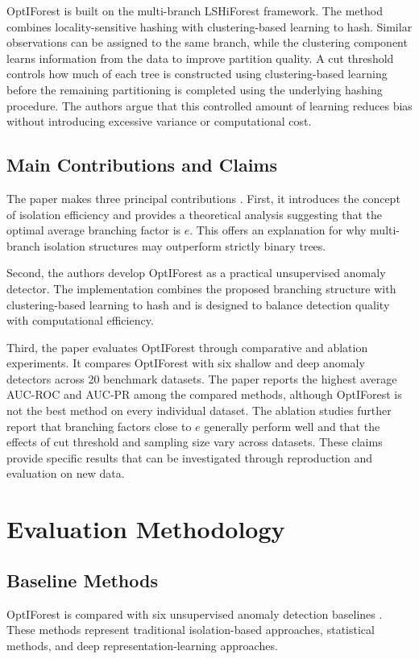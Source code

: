\documentclass[11pt]{article}
\begin{document}
OptIForest is built on the multi-branch LSHiForest framework. The method
combines locality-sensitive hashing with clustering-based learning to
hash. Similar observations can be assigned to the same branch, while
the clustering component learns information from the data to improve
partition quality. A cut threshold controls how much of each tree is
constructed using clustering-based learning before the remaining
partitioning is completed using the underlying hashing procedure. The
authors argue that this controlled amount of learning reduces bias
without introducing excessive variance or computational cost.

\subsection{Main Contributions and Claims}
The paper makes three principal contributions
\citep{xiang2023optiforest}. First, it introduces the concept of
isolation efficiency and provides a theoretical analysis suggesting
that the optimal average branching factor is \(e\). This offers an
explanation for why multi-branch isolation structures may outperform
strictly binary trees.

Second, the authors develop OptIForest as a practical unsupervised
anomaly detector. The implementation combines the proposed branching
structure with clustering-based learning to hash and is designed to
balance detection quality with computational efficiency.

Third, the paper evaluates OptIForest through comparative and ablation
experiments. It compares OptIForest with six shallow and deep anomaly
detectors across 20 benchmark datasets. The paper reports the highest
average AUC-ROC and AUC-PR among the compared methods, although
OptIForest is not the best method on every individual dataset. The
ablation studies further report that branching factors close to \(e\)
generally perform well and that the effects of cut threshold and
sampling size vary across datasets. These claims provide specific
results that can be investigated through reproduction and evaluation
on new data.

\section{Evaluation Methodology}

\subsection{Baseline Methods}
OptIForest is compared with six unsupervised anomaly detection
baselines \citep{xiang2023optiforest}. These methods represent
traditional isolation-based approaches, statistical methods, and
deep representation-learning approaches.
\end{document}
